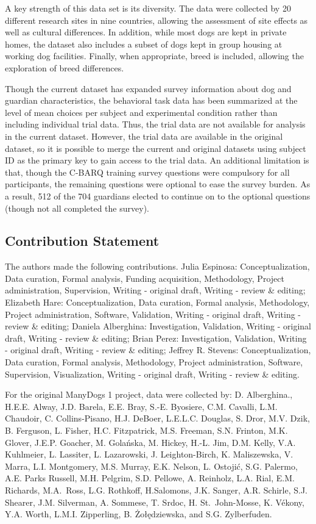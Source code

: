 \documentclass[
  pub,floatsintext]{apa6}
\begin{document}
A key strength of this data set is its diversity. The data were collected by 20 different research sites in nine countries, allowing the assessment of site effects as well as cultural differences. In addition, while most dogs are kept in private homes, the dataset also includes a subset of dogs kept in group housing at working dog facilities. Finally, when appropriate, breed is included, allowing the exploration of breed differences.

Though the current dataset has expanded survey information about dog and guardian characteristics, the behavioral task data has been summarized at the level of mean choices per subject and experimental condition rather than including individual trial data. Thus, the trial data are not available for analysis in the current dataset. However, the trial data are available in the original dataset, so it is possible to merge the current and original datasets using subject ID as the primary key to gain access to the trial data. An additional limitation is that, though the C-BARQ training survey questions were compulsory for all participants, the remaining questions were optional to ease the survey burden. As a result, 512 of the 704 guardians elected to continue on to the optional questions (though not all completed the survey).

\hypertarget{contribution-statement}{%
\subsection{Contribution Statement}\label{contribution-statement}}

The authors made the following contributions. Julia Espinosa: Conceptualization, Data curation, Formal analysis, Funding acquisition, Methodology, Project administration, Supervision, Writing - original draft, Writing - review \& editing; Elizabeth Hare: Conceptualization, Data curation, Formal analysis, Methodology, Project administration, Software, Validation, Writing - original draft, Writing - review \& editing; Daniela Alberghina: Investigation, Validation, Writing - original draft, Writing - review \& editing; Brian Perez: Investigation, Validation, Writing - original draft, Writing - review \& editing; Jeffrey R. Stevens: Conceptualization, Data curation, Formal analysis, Methodology, Project administration, Software, Supervision, Visualization, Writing - original draft, Writing - review \& editing.

For the original ManyDogs 1 project, data were collected by: D. Alberghina., H.E.E. Alway, J.D. Barela, E.E. Bray, S.-E. Byosiere, C.M. Cavalli, L.M. Chaudoir, C. Collins-Pisano, H.J. DeBoer, L.E.L.C. Douglas, S. Dror, M.V. Dzik, B. Ferguson, L. Fisher, H.C. Fitzpatrick, M.S. Freeman, S.N. Frinton, M.K. Glover, J.E.P. Goacher, M. Golańska, M.
Hickey, H.-L. Jim, D.M. Kelly, V.A. Kuhlmeier, L. Lassiter, L. Lazarowski, J. Leighton-Birch, K. Maliszewska, V. Marra, L.I. Montgomery, M.S. Murray, E.K. Nelson, L. Ostojić, S.G. Palermo, A.E. Parks Russell, M.H. Pelgrim, S.D. Pellowe, A. Reinholz, L.A. Rial, E.M. Richards, M.A.~Ross, L.G. Rothkoff, H.Salomons, J.K. Sanger, A.R. Schirle, S.J. Shearer, J.M. Silverman, A. Sommese, T. Srdoc, H. St.~John-Mosse, K. Vékony, Y.A. Worth, L.M.I. Zipperling, B. Żołędziewska, and S.G. Zylberfuden.
\end{document}
